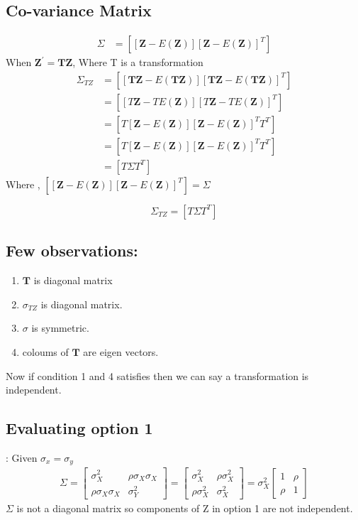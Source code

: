 \documentclass[journal,12pt,twocolumn]{IEEEtran}
\begin{document}
\begin{enumerate}[label=\arabic*.,ref=\theenumi]
\subsection{Co-variance Matrix}
\begin{align}
    \Sigma &= [[\mathbf{Z} - E(\mathbf{Z})][\mathbf{Z} - E(\mathbf{Z})]^T]
\end{align}
When \hspace{5pt} $\mathbf{Z^{'} = TZ}$, \hspace{5pt} Where T is a transformation\\
\begin{align}
\Sigma_{TZ} &= [[\mathbf{TZ} - E(\mathbf{TZ})][\mathbf{TZ} - E(\mathbf{TZ})]^T]\\
    &= [[T\mathbf{Z} - T E(\mathbf{Z})][T\mathbf{Z} - TE(\mathbf{Z})]^T]\\
    &= [T[\mathbf{Z} - E(\mathbf{Z})][\mathbf{Z} - E(\mathbf{Z})]^T T^T]\\
    &= [T[\mathbf{Z} - E(\mathbf{Z})][\mathbf{Z} - E(\mathbf{Z})]^T T^T]\\
    &=  [T \Sigma T^T]
    \end{align}
Where , $[[\mathbf{Z} - E(\mathbf{Z})][\mathbf{Z} - E(\mathbf{Z})]^T] = \Sigma$

\begin{equation}
    \Sigma_{TZ} = [T \Sigma T^T]
\end{equation}
\subsection{Few observations:}
\begin{enumerate}
    \item $\mathbf{T}$ is diagonal matrix
    \item $\sigma_{TZ}$ is diagonal matrix.
    \item $\sigma$ is symmetric.
    \item coloums of $\mathbf{T}$ are eigen vectors.
\end{enumerate}
Now if condition 1 and 4 satisfies then we can say a transformation is independent.
\subsection{Evaluating option 1}:
Given $\sigma_x = \sigma_y$
\begin{align*}
    \Sigma = \begin{bmatrix}
    \sigma_{X}^2              &  \rho \sigma_{X} \sigma_{X} \\
    \rho \sigma_{X} \sigma_{X}  &   \sigma_{Y}^2 
\end{bmatrix} = 
    \begin{bmatrix}
    \sigma_{X}^2          &  \rho \sigma_{X}^2 \\
    \rho \sigma_{X}^2      &   \sigma_{X}^2 
\end{bmatrix} = \sigma_{X}^2 
    \begin{bmatrix}
    1          &  \rho \\
    \rho       &   1
\end{bmatrix}
\end{align*}
$\Sigma$ is not a diagonal matrix so components of Z in option 1 are not independent.

\end{enumerate}
\end{document}
